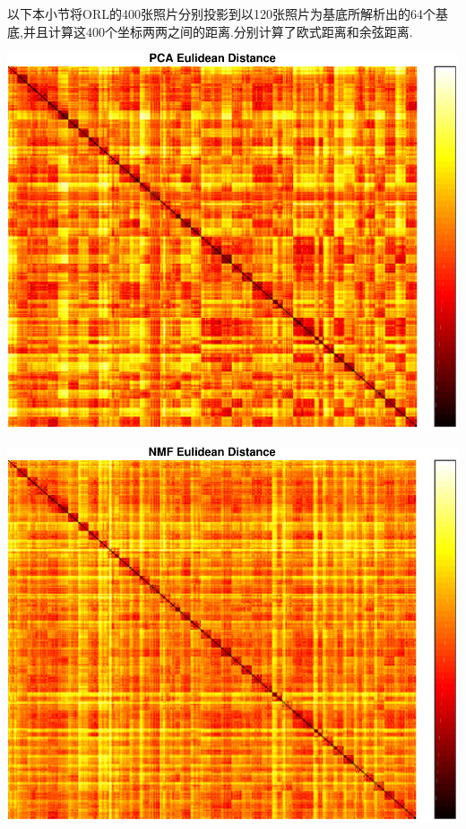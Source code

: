 以下本小节将ORL的400张照片分别投影到以120张照片为基底所解析出的64个基底,并且计算这400个坐标两两之间的距离.分别计算了欧式距离和余弦距离.


\begin{center}
\begin{minipage}[t]{\linewidth}
\center
{
\includegraphics[width=\MyFactor\textwidth]{Img/pcaeu} 
}
\end{minipage}
\medskip
\end{center}

\begin{center}
\begin{minipage}[t]{\linewidth}
\center
{
\includegraphics[width=\MyFactor\textwidth]{Img/nmfeu} 
}
\end{minipage}
\medskip
\end{center}

